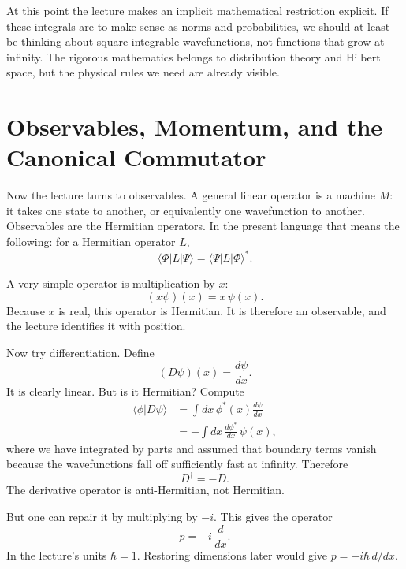 At this point the lecture makes an implicit mathematical restriction explicit. If these integrals are to make sense as norms and probabilities, we should at least be thinking about square-integrable wavefunctions, not functions that grow at infinity. The rigorous mathematics belongs to distribution theory and Hilbert space, but the physical rules we need are already visible.

\section{Observables, Momentum, and the Canonical Commutator}

Now the lecture turns to observables. A general linear operator is a machine \(M\): it takes one state to another, or equivalently one wavefunction to another. Observables are the Hermitian operators. In the present language that means the following: for a Hermitian operator \(L\),
\begin{equation}
\langle \Phi|L|\Psi\rangle=\langle \Psi|L|\Phi\rangle^*.
\end{equation}

A very simple operator is multiplication by \(x\):
\begin{equation}
(x\psi)(x)=x\,\psi(x).
\end{equation}
Because \(x\) is real, this operator is Hermitian. It is therefore an observable, and the lecture identifies it with position.

Now try differentiation. Define
\begin{equation}
(D\psi)(x)=\frac{d\psi}{dx}.
\end{equation}
It is clearly linear. But is it Hermitian? Compute
\begin{align}
\langle \phi|D\psi\rangle
&=\int dx\,\phi^*(x)\frac{d\psi}{dx} \\
&=-\int dx\,\frac{d\phi^*}{dx}\,\psi(x),
\end{align}
where we have integrated by parts and assumed that boundary terms vanish because the wavefunctions fall off sufficiently fast at infinity. Therefore
\begin{equation}
D^\dagger=-D.
\end{equation}
The derivative operator is anti-Hermitian, not Hermitian.

But one can repair it by multiplying by \(-i\). This gives the operator
\begin{equation}
p=-i\,\frac{d}{dx}.
\end{equation}
In the lecture's units \(\hbar=1\). Restoring dimensions later would give \(p=-i\hbar\,d/dx\).

